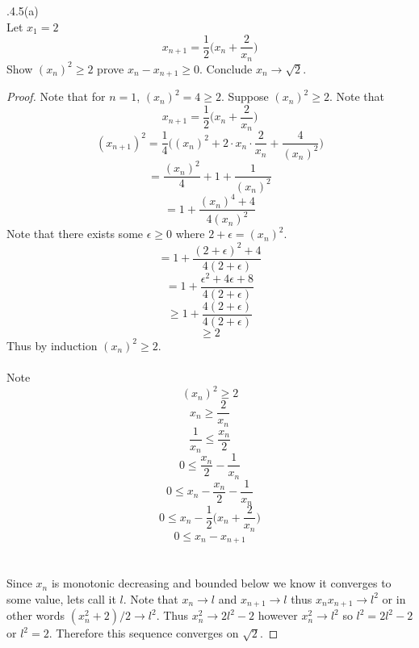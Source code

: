 \documentclass[12pt]{article}
\makeatletter
\theoremstyle{homework}
\newenvironment{exercise}[1]
{\def\@currentlabel{#1}\exercisecore}
{\endexercisecore}
\makeatother
\begin{document}
\begin{exercise}

2.4.5(a)\\
Let $x_1=2$ 
$$ x_{n+1} =\frac{1}{2} \biggr(x_n+\frac{2}{x_n}\biggr)$$
Show $(x_n)^2\geq 2$ prove $x_n-x_{n+1}\geq 0$.  Conclude $x_n\rightarrow \sqrt{2}$.
\end{exercise}
\begin{proof}
Note that for $n=1$, $(x_n)^2=4\geq 2$.  Suppose $(x_n)^2\geq 2$.  Note that
$$ x_{n+1} =\frac{1}{2} \biggr(x_n+\frac{2}{x_n}\biggr)$$
$$ (x_{n+1})^2 =\frac{1}{4} \biggr((x_n)^2+2\cdot x_n\cdot \frac{2}{x_n}+\frac{4}{(x_n)^2}\biggr)$$
$$= \frac{(x_n)^2}{4}+1+\frac{1}{(x_n)^2}$$
$$= 1+\frac{(x_n)^4+4}{4(x_n)^2}$$
Note that there exists some $\epsilon\geq 0$ where $2+\epsilon=(x_n)^2$.
$$= 1+\frac{(2+\epsilon)^2+4}{4(2+\epsilon)}$$
$$= 1+\frac{\epsilon^2+4\epsilon+8}{4(2+\epsilon)}$$
$$\geq 1+\frac{4(2+\epsilon)}{4(2+\epsilon)}$$
$$\geq 2$$
Thus by induction $(x_n)^2\geq 2$.\\\\
Note 
$$(x_{n})^2\geq 2$$
$$x_{n}\geq \frac{2}{x_{n}}$$
$$\frac{1}{x_{n}}\leq \frac{x_{n}}{2}$$
$$0\leq \frac{x_{n}}{2}-\frac{1}{x_{n}}$$
$$0\leq x_{n}-\frac{x_{n}}{2}-\frac{1}{x_{n}}$$
$$0\leq x_{n}-\frac{1}{2}\biggr(x_{n}+\frac{2}{x_{n}}\biggr)$$
$$0\leq x_{n}-x_{n+1}$$\\\\
Since $x_n$ is monotonic decreasing and bounded below we know it converges to some value, lets call it $l$.  Note that $x_n\rightarrow l$ and $x_{n+1}\rightarrow l$ thus $x_nx_{n+1}\rightarrow l^2$ or in other words $(x_n^2+2)/2\rightarrow l^2$.  Thus $x_n^2\rightarrow 2l^2-2$ however $x_n^2\rightarrow l^2$ so $l^2=2l^2-2$ or $l^2=2$.  Therefore this sequence converges on $\sqrt{2}$.
\end{proof}
\end{document}
